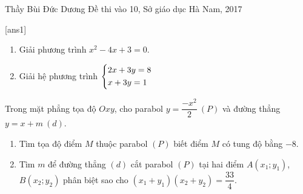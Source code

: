 \begin{name}
{Thầy  Bùi Đức Dương}
{Đề thi vào 10, Sở giáo dục Hà Nam, 2017}
\end{name}
\setcounter{ex}{0}
[ans1]
\begin{ex}%
\hfill
\begin{enumerate}
\item Giải phương trình $x^{2}-4x+3=0$.
\item Giải hệ phương trình $\left\{\begin{aligned}
&2x+3y=8\\
&x+3y=1
\end{aligned}\right.$
\end{enumerate}
\end{ex}
\begin{ex}%
Trong mặt phẳng tọa độ $Oxy$, cho parabol $y=\dfrac{-x^{2}}{2}\ (P)$ và đường thẳng $y=x+m\ (d)$.
\begin{enumerate}
\item Tìm tọa độ điểm $M$ thuộc parabol $(P)$ biết điểm $M$ có tung độ bằng $-8$.
\item Tìm $m$ để đường thẳng $(d)$ cắt parabol $(P)$ tại hai điểm $A(x_{1};y_{1})$, $B(x_{2};y_{2})$ phân biệt sao cho $(x_{1}+y_{1})(x_{2}+y_{2})=\dfrac{33}{4}$.
\end{enumerate}
\end{ex}
